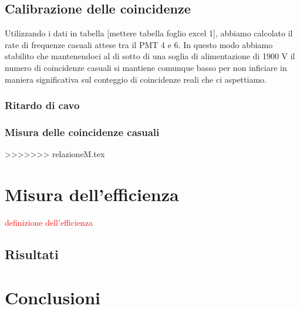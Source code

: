 \documentclass[a4paper,10pt]{article}
\newcommand{\note}[1]{\textcolor{red}{#1}}
\begin{document}
\subsection{Calibrazione delle coincidenze}
Utilizzando i dati in tabella [mettere tabella foglio excel 1], abbiamo calcolato il rate di frequenze casuali attese tra il PMT 4 e 6. In questo modo abbiamo stabilito che mantenendoci al di sotto di una soglia di alimentazione di 1900 V il numero di coincidenze casuali si mantiene comunque basso per non inficiare in maniera significativa sul conteggio di coincidenze reali che ci aspettiamo.

\subsubsection{Ritardo di cavo}

\subsubsection{Misura delle coincidenze casuali}

>>>>>>> relazioneM.tex

\section{Misura dell'efficienza}
\note{definizione dell'efficienza}
\subsection{Risultati}
\label{sec:efficienza} 


\section{Conclusioni}

\end{document}

